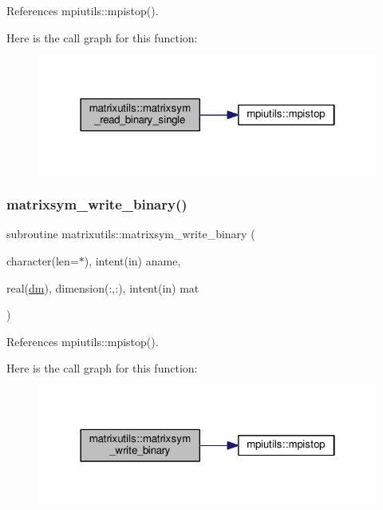 References mpiutils\+::mpistop().

Here is the call graph for this function\+:
\nopagebreak
\begin{figure}[H]
\begin{center}
\leavevmode
\includegraphics[width=322pt]{namespacematrixutils_a592726195f2a952a006391bde92cd2b0_cgraph}
\end{center}
\end{figure}
\mbox{\label{namespacematrixutils_ac49e65871c4266da9c687b474d1908d8}} 
\subsubsection{\texorpdfstring{matrixsym\+\_\+write\+\_\+binary()}{matrixsym\_write\_binary()}}
{\footnotesize\ttfamily subroutine matrixutils\+::matrixsym\+\_\+write\+\_\+binary (\begin{DoxyParamCaption}\item[{character(len=$\ast$), intent(in)}]{aname,  }\item[{real(\mbox{\hyperlink{namespacematrixutils_a7bdc564986ea4d90f51201c75606ef3d}{dm}}), dimension(\+:,\+:), intent(in)}]{mat }\end{DoxyParamCaption})}



References mpiutils\+::mpistop().

Here is the call graph for this function\+:
\nopagebreak
\begin{figure}[H]
\begin{center}
\leavevmode
\includegraphics[width=322pt]{namespacematrixutils_ac49e65871c4266da9c687b474d1908d8_cgraph}
\end{center}
\end{figure}
\mbox{\label{namespacematrixutils_acbfa12c533184738072f7f9a35e7cfc7}} 
